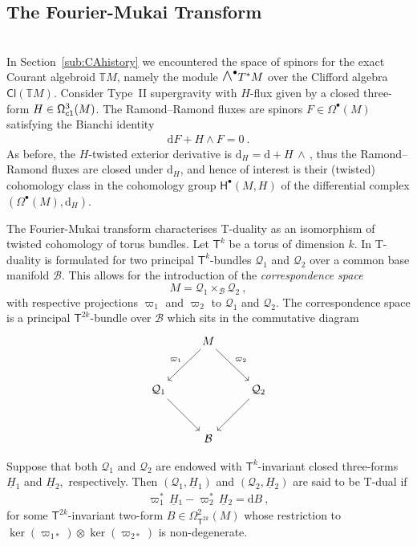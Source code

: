 \documentclass[a4paper, reqno, 11pt]{amsart}
\numberwithin{equation}{section}
\theoremstyle{definition}
\newcommand{\red}[1]{\underline{#1}}
\newcommand{\de}{\mathrm{d}}
\newcommand{\IT}{\mathbb{T}}
\newcommand{\cB}{{\mathcal B}}
\newcommand{\cQ}{{\mathcal Q}}
\newcommand{\sfT}{{\mathsf{T}}}
\newcommand{\sfH}{{\mathsf{H}}}
\newcommand{\sfOmega}{{\mathsf{\Omega}}}
\newcommand{\sfCl}{\mathsf{Cl}}
\newcommand{\midwedge}{\text {\Large$\wedge$}}
\theoremstyle{remark}
\begin{document}
\medskip

\subsection{The Fourier-Mukai Transform}~\\[5pt]
\label{sub:TDualityFM_intro}
In Section~\ref{sub:CAhistory} we encountered the space of spinors for the exact Courant algebroid $\IT M$, namely the module $\midwedge^\bullet T^*M$ over the Clifford algebra $\sfCl(\IT M)$. Consider Type~II supergravity with $H$-flux given by a closed three-form $H\in \sfOmega_{\tt cl}^3(M)$. The Ramond--Ramond fluxes are spinors $F \in \sfOmega^\bullet(M)$ satisfying the Bianchi identity
\begin{align}
    \de F + H \wedge F = 0 \ .
\end{align}
As before, the $H$-twisted exterior derivative is $\de_H = \de + H \, \wedge\,$,  
thus the Ramond--Ramond fluxes are closed under $\de_H$, and hence of interest is their (twisted) cohomology class in the cohomology group $\sfH^\bullet(M,H)$ of the differential complex $(\sfOmega^\bullet(M), \de_H)$.

The Fourier-Mukai transform characterises T-duality as an isomorphism of twisted cohomology of torus bundles. Let $\sfT^k$ be a torus of dimension $k$.
In \cite{Bouwknegt2003topology, cavalcanti2011generalized} T-duality is formulated for two principal $\sfT^k$-bundles $\cQ_1$ and $\cQ_2$ over a common base manifold $\cB$. This allows for the introduction of the \emph{correspondence space} $$M = \cQ_1 \times_\cB \cQ_2 \ , $$ with respective projections $\varpi_1$ and $\varpi_2$ to $\cQ_1$ and $\cQ_2$. The correspondence space is a principal $\sfT^{2k}$-bundle over $\cB$ which sits in the commutative diagram 
\begin{equation}\label{eqn:correspondence}
\begin{tikzcd}[row sep = 1cm]
 & M \arrow[dl,"\varpi_1",swap] \arrow[dr,"\varpi_2"] & \\
 \cQ_1 \arrow[dr] &  & \cQ_2 \arrow[dl] \\ 
 & \cB &
\end{tikzcd}
\end{equation}

Suppose that both $\cQ_1$ and $\cQ_2$ are endowed with  $\sfT^k$-invariant closed three-forms $\red H{}_1$ and $\red H{}_2,$ respectively.
Then $(\cQ_1,\red H{}_1)$ and $(\cQ_2,\red H{}_2)$ are said to be T-dual if 
\begin{align}
 \varpi_1^*\, \red H{}_1 - \varpi_2^*\, \red H{}_2 = \de B \ ,
\end{align}
for some $\sfT^{2k}$-invariant two-form $B \in \mathsf{\Omega}^2_{\sfT^{2k}}(M)$ whose restriction to $\ker(\varpi_{1*}) \otimes \ker(\varpi_{2 *})$ is non-degenerate. 
\end{document}

